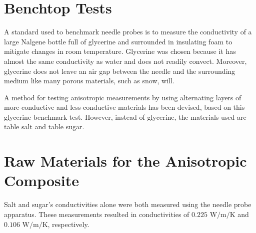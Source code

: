 \section{Benchtop Tests}

A standard used to benchmark needle probes is to measure the conductivity of a
large Nalgene bottle full of glycerine and surrounded in insulating foam to
mitigate changes in room temperature. Glycerine was chosen because it
has almost the same conductivity as water and does not readily convect. Moreover,
glycerine does not leave an air gap between the needle and the surrounding
medium like many porous materials, such as snow, will.

A method for testing anisotropic measurements by using alternating
layers of more-conductive and less-conductive materials has been devised, based on
this glycerine benchmark test. However, instead of glycerine, the materials
used are table salt and table sugar.

\section{Raw Materials for the Anisotropic Composite}

Salt and sugar's conductivities alone were both measured using the needle probe
apparatus. These measurements resulted in conductivities of
\(0.225\) \(\textrm{W}/\textrm{m}/\textrm{K}\) and 
\(0.106\) \(\textrm{W}/\textrm{m}/\textrm{K}\), respectively.

